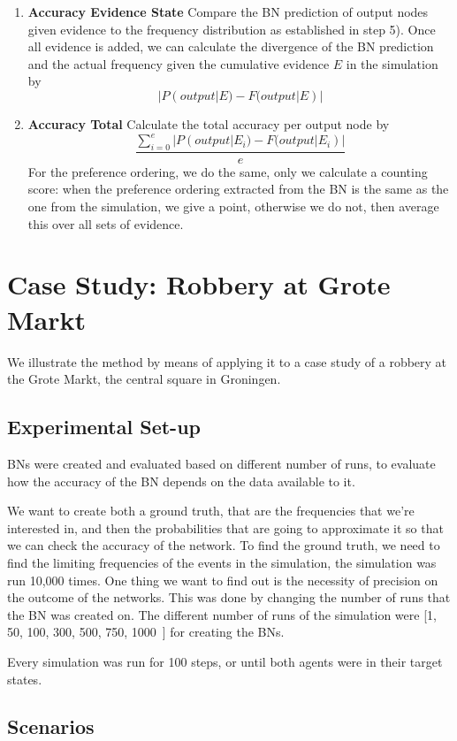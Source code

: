 \documentclass[12pt]{article}
\begin{document}
\begin{enumerate}
\item \textbf{Accuracy Evidence State} Compare the BN prediction of output nodes given evidence to the frequency distribution as established in step 5). Once all evidence is added, we can calculate the divergence of the BN prediction and the actual frequency given the cumulative evidence $E$ in the simulation by \[|P(output|E) - F(output|E)|\]
\item \textbf{Accuracy Total} Calculate the total accuracy per output node by \[\frac{\sum_{i=0}^{e}|P(output | E_i) - F(output| E_i)|}{e}\] For the preference ordering, we do the same, only we calculate a counting score: when the preference ordering extracted from the BN is the same as the one from the simulation, we give a point, otherwise we do not, then average this over all sets of evidence.
\end{enumerate}


\newpage


\section{Case Study: Robbery at Grote Markt}
We illustrate the method by means of applying it to a case study of a robbery at the Grote Markt, the central square in Groningen.

\subsection{Experimental Set-up}
BNs were created and evaluated based on different number of runs, to evaluate how the accuracy of the BN depends on the data available to it. 

We want to create both a ground truth, that are the frequencies that we're interested in, and then the probabilities that are going to approximate it so that we can check the accuracy of the network. To find the ground truth, we need to find the limiting frequencies of the events in the simulation, the simulation was run 10,000 times. One thing we want to find out is the necessity of precision on the outcome of the networks. This was done by changing the number of runs that the BN was created on. The different number of runs of the simulation were [1, 50, 100, 300, 500, 750, 1000~] for creating the BNs.


Every simulation was run for 100 steps, or until both agents were in their target states. 


\subsection{Scenarios}
\end{document}
